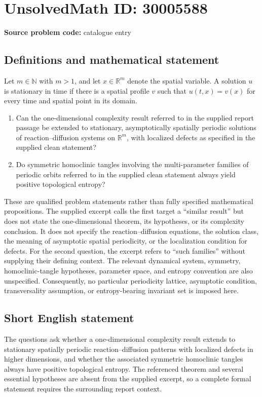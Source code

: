 \documentclass[11pt]{article}
\newcommand{\N}{\mathbb{N}}
\newcommand{\R}{\mathbb{R}}
\begin{document}
\section*{UnsolvedMath ID: 30005588}
\textbf{Source problem code:} catalogue entry
\subsection{Definitions and mathematical statement}
Let \(m\in\N\) with \(m>1\), and let \(x\in\R^m\) denote the spatial variable. A solution \(u\) is stationary in time if there is a spatial profile \(v\) such that \(u(t,x)=v(x)\) for every time and spatial point in its domain.

\begin{enumerate}
\item Can the one-dimensional complexity result referred to in the supplied report passage be extended to stationary, asymptotically spatially periodic solutions of reaction--diffusion systems on \(\R^m\), with localized defects as specified in the supplied clean statement?
\item Do symmetric homoclinic tangles involving the multi-parameter families of periodic orbits referred to in the supplied clean statement always yield positive topological entropy?
\end{enumerate}

These are qualified problem statements rather than fully specified mathematical propositions. The supplied excerpt calls the first target a ``similar result'' but does not state the one-dimensional theorem, its hypotheses, or its complexity conclusion. It does not specify the reaction--diffusion equations, the solution class, the meaning of asymptotic spatial periodicity, or the localization condition for defects. For the second question, the excerpt refers to ``such families'' without supplying their defining context. The relevant dynamical system, symmetry, homoclinic-tangle hypotheses, parameter space, and entropy convention are also unspecified. Consequently, no particular periodicity lattice, asymptotic condition, transversality assumption, or entropy-bearing invariant set is imposed here.
\subsection{Short English statement}
The questions ask whether a one-dimensional complexity result extends to stationary spatially periodic reaction--diffusion patterns with localized defects in higher dimensions, and whether the associated symmetric homoclinic tangles always have positive topological entropy. The referenced theorem and several essential hypotheses are absent from the supplied excerpt, so a complete formal statement requires the surrounding report context.
\end{document}
